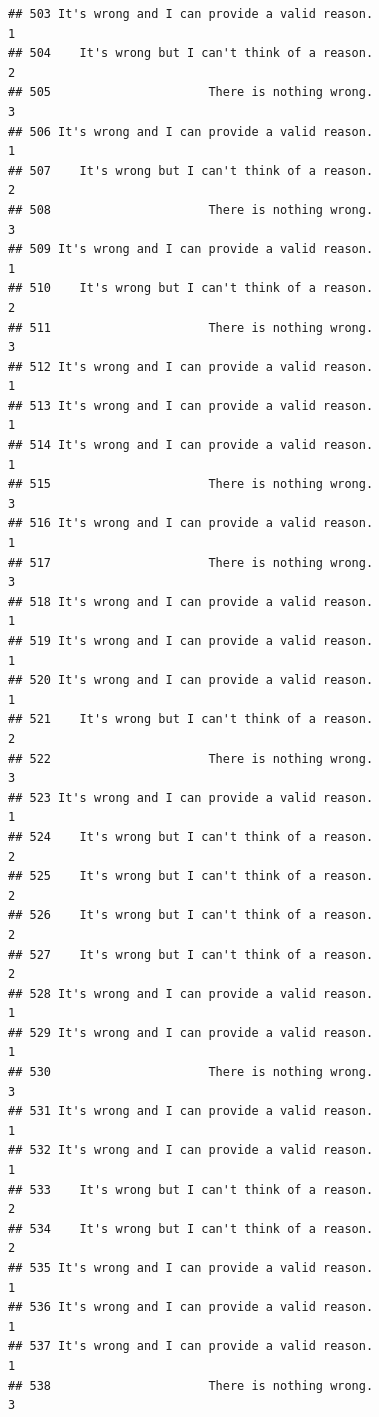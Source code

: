 \documentclass[
  american,
  man,floatsintext]{apa7}
\begin{document}
\begin{verbatim}
## 503 It's wrong and I can provide a valid reason.                    1
## 504    It's wrong but I can't think of a reason.                    2
## 505                      There is nothing wrong.                    3
## 506 It's wrong and I can provide a valid reason.                    1
## 507    It's wrong but I can't think of a reason.                    2
## 508                      There is nothing wrong.                    3
## 509 It's wrong and I can provide a valid reason.                    1
## 510    It's wrong but I can't think of a reason.                    2
## 511                      There is nothing wrong.                    3
## 512 It's wrong and I can provide a valid reason.                    1
## 513 It's wrong and I can provide a valid reason.                    1
## 514 It's wrong and I can provide a valid reason.                    1
## 515                      There is nothing wrong.                    3
## 516 It's wrong and I can provide a valid reason.                    1
## 517                      There is nothing wrong.                    3
## 518 It's wrong and I can provide a valid reason.                    1
## 519 It's wrong and I can provide a valid reason.                    1
## 520 It's wrong and I can provide a valid reason.                    1
## 521    It's wrong but I can't think of a reason.                    2
## 522                      There is nothing wrong.                    3
## 523 It's wrong and I can provide a valid reason.                    1
## 524    It's wrong but I can't think of a reason.                    2
## 525    It's wrong but I can't think of a reason.                    2
## 526    It's wrong but I can't think of a reason.                    2
## 527    It's wrong but I can't think of a reason.                    2
## 528 It's wrong and I can provide a valid reason.                    1
## 529 It's wrong and I can provide a valid reason.                    1
## 530                      There is nothing wrong.                    3
## 531 It's wrong and I can provide a valid reason.                    1
## 532 It's wrong and I can provide a valid reason.                    1
## 533    It's wrong but I can't think of a reason.                    2
## 534    It's wrong but I can't think of a reason.                    2
## 535 It's wrong and I can provide a valid reason.                    1
## 536 It's wrong and I can provide a valid reason.                    1
## 537 It's wrong and I can provide a valid reason.                    1
## 538                      There is nothing wrong.                    3

\end{verbatim}
\end{document}
